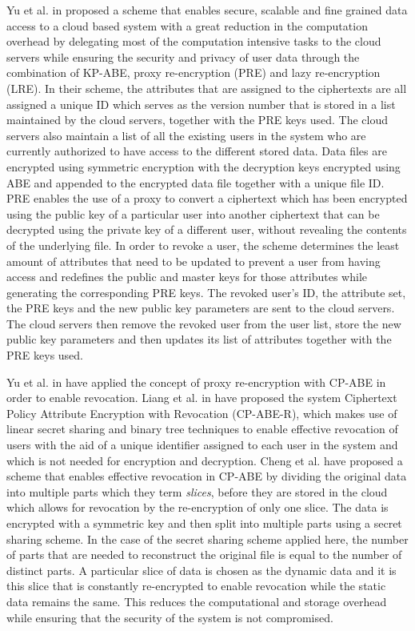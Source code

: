 Yu et al. in \cite{Yu2010} proposed a scheme that enables secure, scalable and fine grained data access to a cloud based system with a great reduction in the computation overhead by delegating most of the computation intensive tasks to the cloud servers while ensuring the security and privacy of user data through the combination of KP-ABE, proxy re-encryption (PRE) and lazy re-encryption (LRE). In their scheme, the attributes that are assigned to the ciphertexts are all assigned a unique ID which serves as the version number that is stored in a list maintained by the cloud servers, together with the PRE keys used. The cloud servers also maintain a list of all the existing users in the system who are currently authorized to have access to the different stored data. Data files are encrypted using symmetric encryption with the decryption keys encrypted using ABE and appended to the encrypted data file together with a unique file ID. PRE enables the use of a proxy to convert a ciphertext which has been encrypted using the public key of a particular user into another ciphertext that can be decrypted using the private key of a different user, without revealing the contents of the underlying file. In order to revoke a user, the scheme determines the least amount of attributes that need to be updated to prevent a user from having access and redefines the public and master keys for those attributes while generating the corresponding PRE keys. The revoked user's ID, the attribute set, the PRE keys and the new public key parameters are sent to the cloud servers. The cloud servers then remove the revoked user from the user list, store the new public key parameters and then updates its list of attributes together with the PRE keys used.

Yu et al. in \cite{Yu2010a} have applied the concept of proxy re-encryption with CP-ABE in order to enable revocation. Liang et al. in \cite{Liang2011} have proposed the system Ciphertext Policy Attribute Encryption with Revocation (CP-ABE-R), which makes use of linear secret sharing and binary tree techniques to enable effective revocation of users with the aid of a unique identifier assigned to each user in the system and which is not needed for encryption and decryption. Cheng et al. have proposed a scheme \cite{Cheng2013} that enables effective revocation in CP-ABE by dividing the original data into multiple parts which they term \textit{slices}, before they are stored in the cloud which allows for revocation by the re-encryption of only one slice. The data is encrypted with a symmetric key and then split into multiple parts using a secret sharing scheme. In the case of the secret sharing scheme applied here, the number of parts that are needed to reconstruct the original file is equal to the number of distinct parts. A particular slice of data is chosen as the dynamic data and it is this slice that is constantly re-encrypted to enable revocation while the static data remains the same. This reduces the computational and storage overhead while ensuring that the security of the system is not compromised.


